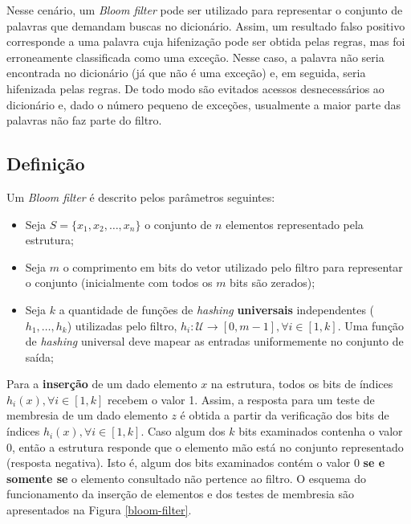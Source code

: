 \documentclass[12pt,twoside,english,brazilian]{article}
\begin{document}
Nesse cenário, um \textit{Bloom filter} pode ser utilizado para representar o conjunto de palavras que demandam buscas no dicionário. Assim, um resultado falso positivo corresponde a uma palavra cuja hifenização pode ser obtida pelas regras, mas foi erroneamente classificada como uma exceção. Nesse caso, a palavra não seria encontrada no dicionário (já que não é uma exceção) e, em seguida, seria hifenizada pelas regras. De todo modo são evitados acessos desnecessários ao dicionário e, dado o número pequeno de exceções, usualmente a maior parte das palavras não faz parte do filtro.

\subsection{Definição}

Um \textit{Bloom filter} é descrito pelos parâmetros seguintes:

\begin{itemize}
    \item Seja $S = \{ x_1, x_2, \dots, x_n \}$ o conjunto de $n$ elementos representado pela estrutura;
    \item Seja $m$ o comprimento em bits do vetor utilizado pelo filtro para representar o conjunto (inicialmente com todos os $m$ bits são zerados);
    \item Seja $k$ a quantidade de funções de \textit{hashing} \textbf{universais} independentes ($h_1, \dots, h_k$) utilizadas pelo filtro, $h_i: \mathcal{U} \to [0, m-1], \forall i \in [1, k]$. Uma função de \textit{hashing} universal deve mapear as entradas uniformemente no conjunto de saída;
\end{itemize}

Para a \textbf{inserção} de um dado elemento $x$ na estrutura, todos os bits de índices $h_i(x), \forall i \in [1,k]$ recebem o valor 1. Assim, a resposta para um teste de membresia de um dado elemento $z$ é obtida a partir da verificação dos bits de índices $h_i(x), \forall i \in [1,k]$. Caso algum dos $k$ bits examinados contenha o valor 0, então a estrutura responde que o elemento mão está no conjunto representado (resposta negativa). Isto é, algum dos bits examinados contém o valor 0 \textbf{se e somente se} o elemento consultado não pertence ao filtro. O esquema do funcionamento da inserção de elementos e dos testes de membresia são apresentados na Figura \ref{bloom-filter}.
\end{document}

